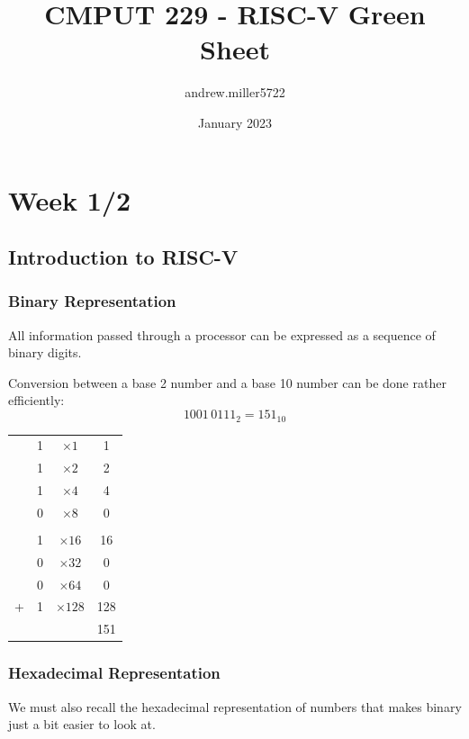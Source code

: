 \documentclass{article}
\title{CMPUT 229 - RISC-V Green Sheet}
\author{andrew.miller5722 }
\date{January 2023}
\begin{document}
	\section{Week 1/2}
	\subsection{Introduction to RISC-V}
	\subsubsection{Binary Representation}
		All information passed through a processor can be expressed as a sequence of binary digits.
		
		
		Conversion between a base 2 number and a base 10 number can be done rather efficiently:\\
		\begin{equation}
			1001\,0111_2 = 151_{10}
		\end{equation}
	\begin{center}
		\begin{tabular}{c c c c}
			&1 & $\times 1$& 1\\
			&1 & $\times 2$& 2\\
			&1 & $\times 4$& 4\\
			&0 & $\times 8$& 0\\
			&&&\\
			&1 & $\times 16$& 16\\
			&0 & $\times 32$& 0\\
			&0 & $\times 64$& 0\\
			+&1 & $\times 128$& 128\\
			\hline
			& & & 151		 
		\end{tabular}
\end{center}
	\subsubsection{Hexadecimal Representation}
	We must also recall the hexadecimal representation of numbers that makes binary just a bit easier to look at. %
\end{document}
